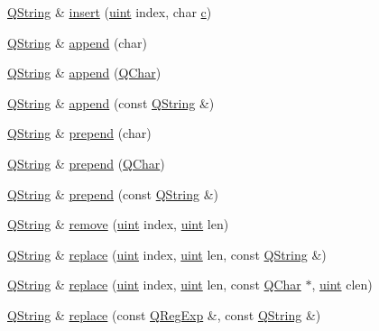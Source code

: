 \begin{DoxyCompactItemize}
\item 
\hyperlink{class_q_string}{Q\+String} \& \hyperlink{class_q_string_a2a54fe338baa21cba270e207f9edef97}{insert} (\hyperlink{qglobal_8h_a4d3943ddea65db7163a58e6c7e8df95a}{uint} index, char \hyperlink{060__command__switch_8tcl_ab14f56bc3bd7680490ece4ad7815465f}{c})
\item 
\hyperlink{class_q_string}{Q\+String} \& \hyperlink{class_q_string_a5e251de7eb95440be1fed6e0afef0638}{append} (char)
\item 
\hyperlink{class_q_string}{Q\+String} \& \hyperlink{class_q_string_a1f09a541ae63558a63be07fb2c6b6e58}{append} (\hyperlink{class_q_char}{Q\+Char})
\item 
\hyperlink{class_q_string}{Q\+String} \& \hyperlink{class_q_string_a212b80401444eb3f67321fb55ddf64d5}{append} (const \hyperlink{class_q_string}{Q\+String} \&)
\item 
\hyperlink{class_q_string}{Q\+String} \& \hyperlink{class_q_string_a960e7c9c3ead447bd3da1332ca06a796}{prepend} (char)
\item 
\hyperlink{class_q_string}{Q\+String} \& \hyperlink{class_q_string_a31c38932a11a53c4d56bd286786cb1ed}{prepend} (\hyperlink{class_q_char}{Q\+Char})
\item 
\hyperlink{class_q_string}{Q\+String} \& \hyperlink{class_q_string_a105a5d5c7d527ecdc01b0e3e34edfc52}{prepend} (const \hyperlink{class_q_string}{Q\+String} \&)
\item 
\hyperlink{class_q_string}{Q\+String} \& \hyperlink{class_q_string_afd08aabf1d9b04a3fef298290af04cbd}{remove} (\hyperlink{qglobal_8h_a4d3943ddea65db7163a58e6c7e8df95a}{uint} index, \hyperlink{qglobal_8h_a4d3943ddea65db7163a58e6c7e8df95a}{uint} len)
\item 
\hyperlink{class_q_string}{Q\+String} \& \hyperlink{class_q_string_aa785aa8e254ae8704f1a960245f3337e}{replace} (\hyperlink{qglobal_8h_a4d3943ddea65db7163a58e6c7e8df95a}{uint} index, \hyperlink{qglobal_8h_a4d3943ddea65db7163a58e6c7e8df95a}{uint} len, const \hyperlink{class_q_string}{Q\+String} \&)
\item 
\hyperlink{class_q_string}{Q\+String} \& \hyperlink{class_q_string_a61605f13535774a3b048370a04aff78c}{replace} (\hyperlink{qglobal_8h_a4d3943ddea65db7163a58e6c7e8df95a}{uint} index, \hyperlink{qglobal_8h_a4d3943ddea65db7163a58e6c7e8df95a}{uint} len, const \hyperlink{class_q_char}{Q\+Char} $\ast$, \hyperlink{qglobal_8h_a4d3943ddea65db7163a58e6c7e8df95a}{uint} clen)
\item 
\hyperlink{class_q_string}{Q\+String} \& \hyperlink{class_q_string_aaee914b4744ada084543c212bc1b3a21}{replace} (const \hyperlink{class_q_reg_exp}{Q\+Reg\+Exp} \&, const \hyperlink{class_q_string}{Q\+String} \&)

\end{DoxyCompactItemize}
